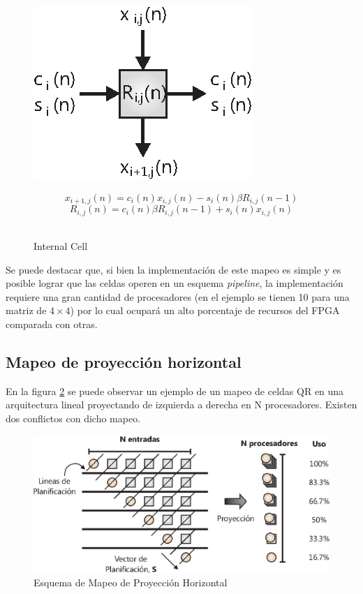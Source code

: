\begin{figure}[h!]
        \centering
        \begin{minipage}[b]{0.4\textwidth}
        	\centering
            \includegraphics[width=3 cm]{./figures/C03-ic}
            \caption{Internal Cell}
            \label{fig:direct_mapping_3}
        \end{minipage}%
		\begin{minipage}[b]{0.6\textwidth}
			\small
			\begin{equation}
			\label{eq:internal_cell_1}
			x_{i+1,j}(n) = c_i(n) x_{i,j}(n) - s_i(n) \beta R_{i,j}(n-1)
			\end{equation}
			\begin{equation}
			\label{eq:internal_cell_2}
			R_{i,j}(n) = c_i(n) \beta R_{i,j}(n-1) + s_i(n) x_{i,j}(n)
			\end{equation} \\
			\normalsize
		\end{minipage}%
\end{figure}

Se puede destacar que, si bien la implementación de este mapeo es simple y es posible lograr que las celdas operen en un esquema \textit{pipeline}, la implementación requiere una gran cantidad de procesadores (en el ejemplo se tienen 10 para una matriz de $4 \times 4$) por lo cual ocupará un alto porcentaje de recursos del FPGA comparada con otras.

\subsection{Mapeo de proyección horizontal}

En la figura \ref{fig:horizontal_mapping} se puede observar un ejemplo de un mapeo de celdas QR en una arquitectura lineal proyectando de izquierda a derecha en N procesadores. Existen dos conflictos con dicho mapeo.

\begin{figure}[h!]
        \centering
        \includegraphics[width=13cm]{./figures/C03-horizontal_mapping}
        \caption{Esquema de Mapeo de Proyección Horizontal}
        \label{fig:horizontal_mapping}
\end{figure}

